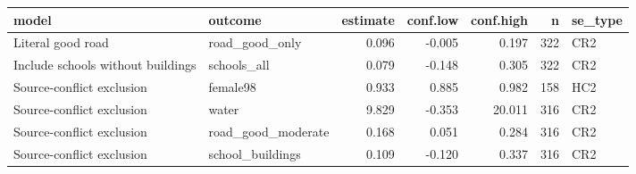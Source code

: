 
\begin{tabular}{llrrrrl}
\toprule
model & outcome & estimate & conf.low & conf.high & n & se\_type\\
\midrule
Literal good road & road\_good\_only & 0.096 & -0.005 & 0.197 & 322 & CR2\\
Include schools without buildings & schools\_all & 0.079 & -0.148 & 0.305 & 322 & CR2\\
Source-conflict exclusion & female98 & 0.933 & 0.885 & 0.982 & 158 & HC2\\
Source-conflict exclusion & water & 9.829 & -0.353 & 20.011 & 316 & CR2\\
Source-conflict exclusion & road\_good\_moderate & 0.168 & 0.051 & 0.284 & 316 & CR2\\
\addlinespace
Source-conflict exclusion & school\_buildings & 0.109 & -0.120 & 0.337 & 316 & CR2\\
\bottomrule
\end{tabular}
